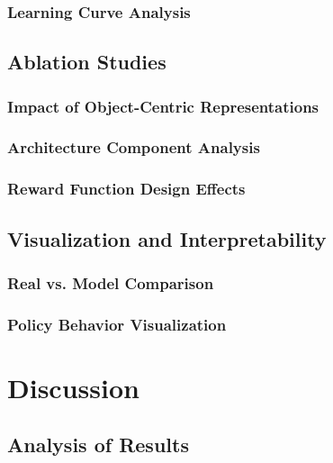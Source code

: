 \documentclass[
	english,
	ruledheaders=section,
	class=report,
	thesis={type=master},
	accentcolor=9c,
	custommargins=true,
	marginpar=false,
	parskip=half-,
	fontsize=11pt,
]{tudapub}
\begin{document}
\subsection{Learning Curve Analysis}
\label{subsec:learning_curves}

\section{Ablation Studies}
\label{sec:ablation_studies}

\subsection{Impact of Object-Centric Representations}
\label{subsec:oc_impact}

\subsection{Architecture Component Analysis}
\label{subsec:architecture_analysis}

\subsection{Reward Function Design Effects}
\label{subsec:reward_effects}

\section{Visualization and Interpretability}
\label{sec:visualization}

\subsection{Real vs. Model Comparison}
\label{subsec:real_vs_model}

\subsection{Policy Behavior Visualization}
\label{subsec:policy_visualization}

\chapter{Discussion}
\label{chap:discussion}

\section{Analysis of Results}
\label{sec:results_analysis}
\end{document}
